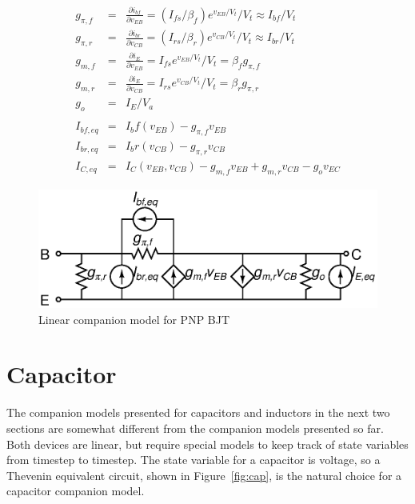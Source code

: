\documentclass{article}
\begin{document}
\begin{eqnarray}
g_{\pi,f}&=&\frac{\partial i_{bf}}{\partial v_{EB}}=(I_{fs}/\beta_f)e^{v_{EB}/V_t}/V_t \approx I_{bf}/V_t \\
g_{\pi,r}&=&\frac{\partial i_{br}}{\partial v_{CB}}=(I_{rs}/\beta_r)e^{v_{CB}/V_t}/V_t \approx I_{br}/V_t \\
g_{m,f}&=&\frac{\partial i_E}{\partial v_{EB}}=I_{fs}e^{v_{EB}/V_t}/V_t=\beta_fg_{\pi,f} \\
g_{m,r}&=&\frac{\partial i_E}{\partial v_{CB}}=I_{rs}e^{v_{CB}/V_t}/V_t=\beta_rg_{\pi,r} \\
g_o&=&I_E/V_a \\
\nonumber \\
I_{bf,eq}&=&I_bf(v_{EB})-g_{\pi,f}v_{EB} \\
I_{br,eq}&=&I_br(v_{CB})-g_{\pi,r}v_{CB} \\
I_{C,eq}&=&I_C(v_{EB},v_{CB})-g_{m,f}v_{EB}+g_{m,r}v_{CB}-g_ov_{EC}
\end{eqnarray}

\begin{figure}[h]
\begin{center}
\includegraphics{../fig/pnp.eps}
\caption{Linear companion model for PNP BJT \label{fig:pnp}}
\end{center}
\end{figure}

\pagebreak

\section{Capacitor}

The companion models presented for capacitors and inductors in the next two sections are somewhat different from the companion models presented so far.  Both devices are linear, but require special models to keep track of state variables from timestep to timestep.  The state variable for a capacitor is voltage, so a Thevenin equivalent circuit, shown in Figure~\ref{fig:cap}, is the natural choice for a capacitor companion model.
\end{document}
